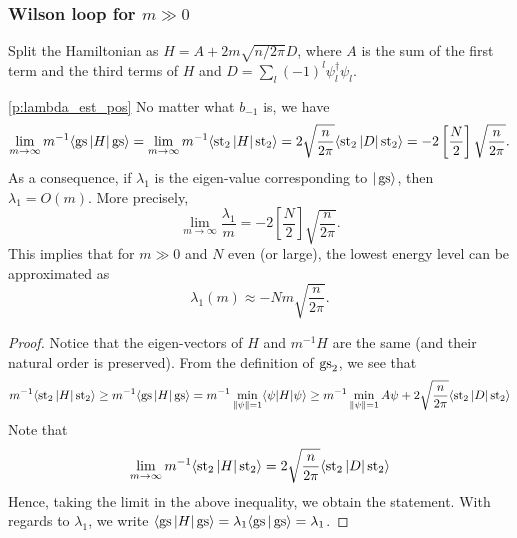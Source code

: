 \subsubsection{Wilson loop for $m \gg 0$}
Split the Hamiltonian as $H = A + 2m\sqrt{n/2\pi} D$, where $A$ is the sum of the first term and the third terms of $H$ and $D = \sum_l (-1)^l \psi_l^\dagger \psi_l$.
\begin{proposition}\ref{p:lambda_est_pos}
No matter what $b_{-1}$ is, we have
\[
\lim_{m \rightarrow \infty}m^{-1} \langle \operatorname{gs} | H| \operatorname{gs}\rangle = \lim_{m \rightarrow \infty} m^{-1}\langle \operatorname{st}_2 | H| \operatorname{st}_2 \rangle =  2\sqrt{\frac{n}{2\pi}} \langle \operatorname{st}_2 | D| \operatorname{st}_2\rangle = -2\left[\frac{N}{2}\right]\sqrt{\frac{n}{2\pi}}.
\]
As a consequence, if $\lambda_1$ is the eigen-value corresponding to $|\operatorname{gs}\rangle$, then $\lambda_1 = O(m)$. More precisely, 
\[
\lim_{m \rightarrow \infty} \frac{\lambda_1}{m} = -2\left[\frac{N}{2}\right]\sqrt{\frac{n}{2\pi}}.
\]
This implies that for $m \gg 0$ and $N$ even (or large), the lowest energy level can be approximated as 
\[
\lambda_1(m) \approx - Nm \sqrt{\frac{n}{2\pi}}.
\]
\end{proposition}
\begin{proof}
Notice that the eigen-vectors of $H$ and $m^{-1}H$ are the same (and their natural order is preserved). From the definition of $\operatorname{gs}_2$, we see that
\[
m^{-1}\langle \operatorname{st}_2 | H| \operatorname{st}_2 \rangle \geq m^{-1}\langle \operatorname{gs} | H| \operatorname{gs} \rangle = m^{-1}\min_{\|\psi\|=1} \langle \psi |H|\psi\rangle \geq m^{-1}\min_{\|\psi\|=1} A\psi + 2\sqrt{\frac{n}{2\pi}} \langle \operatorname{st}_2 | D| \operatorname{st}_2\rangle 
\]
Note that 
\[
\lim_{m\rightarrow \infty} m^{-1}\langle \operatorname{st}_2 | H|\operatorname{st}_2 \rangle = 2\sqrt{\frac{n}{2\pi}} \langle \operatorname{st}_2 | D| \operatorname{st}_2\rangle
\]
Hence, taking the limit in the above inequality, we obtain the statement. With regards to $\lambda_1$, we write $\langle \operatorname{gs} | H| \operatorname{gs} \rangle = \lambda_1\langle \operatorname{gs} |\operatorname{gs}\rangle = \lambda_1$.
\end{proof}


